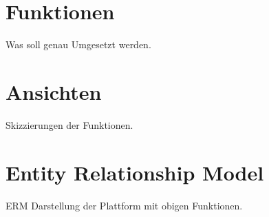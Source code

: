 \section{Funktionen}
Was soll genau Umgesetzt werden.

\section{Ansichten}
Skizzierungen der Funktionen.

\section{Entity Relationship Model}
ERM Darstellung der Plattform mit obigen Funktionen.
